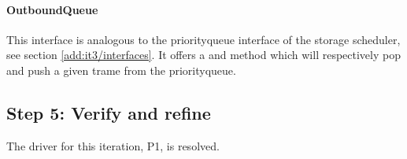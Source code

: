 \paragraph{OutboundQueue}

\npar This interface is analogous to the priorityqueue interface of the storage
scheduler, see section \ref{add:it3/interfaces}. It offers a 
and  method which will respectively pop and push a given
trame from the priorityqueue.

\subsection{Step 5: Verify and refine}
\label{add:it6/verification}

\npar The driver for this iteration, P1, is resolved.